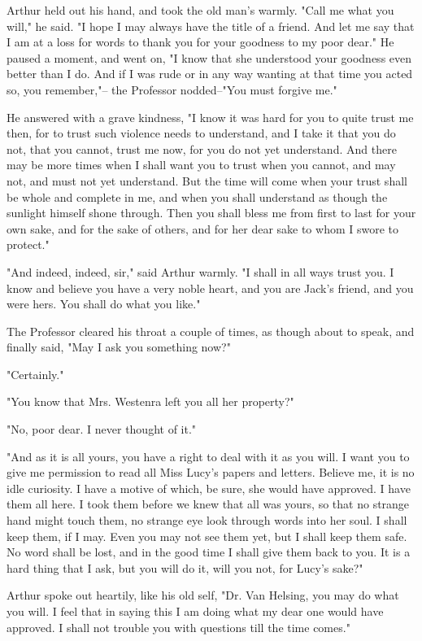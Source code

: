 Arthur held out his hand, and took the old man's warmly. "Call me what you will," he said. "I hope I may always have the title of a friend. And let me say that I am at a loss for words to thank you for your goodness to my poor dear." He paused a moment, and went on, "I know that she understood your goodness even better than I do. And if I was rude or in any way wanting at that time you acted so, you remember,"-- the Professor nodded--"You must forgive me." 

He answered with a grave kindness, "I know it was hard for you to quite trust me then, for to trust such violence needs to understand, and I take it that you do not, that you cannot, trust me now, for you do not yet understand. And there may be more times when I shall want you to trust when you cannot, and may not, and must not yet understand. But the time will come when your trust shall be whole and complete in me, and when you shall understand as though the sunlight himself shone through. Then you shall bless me from first to last for your own sake, and for the sake of others, and for her dear sake to whom I swore to protect." 

"And indeed, indeed, sir," said Arthur warmly. "I shall in all ways trust you. I know and believe you have a very noble heart, and you are Jack's friend, and you were hers. You shall do what you like." 

The Professor cleared his throat a couple of times, as though about to speak, and finally said, "May I ask you something now?" 

"Certainly." 

"You know that Mrs. Westenra left you all her property?" 

"No, poor dear. I never thought of it." 

"And as it is all yours, you have a right to deal with it as you will. I want you to give me permission to read all Miss Lucy's papers and letters. Believe me, it is no idle curiosity. I have a motive of which, be sure, she would have approved. I have them all here. I took them before we knew that all was yours, so that no strange hand might touch them, no strange eye look through words into her soul. I shall keep them, if I may. Even you may not see them yet, but I shall keep them safe. No word shall be lost, and in the good time I shall give them back to you. It is a hard thing that I ask, but you will do it, will you not, for Lucy's sake?" 

Arthur spoke out heartily, like his old self, "Dr. Van Helsing, you may do what you will. I feel that in saying this I am doing what my dear one would have approved. I shall not trouble you with questions till the time comes." 

